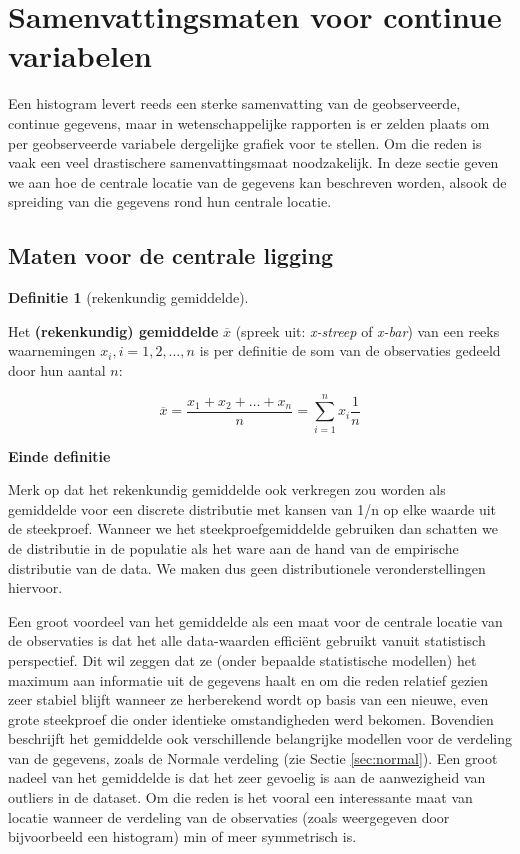 \documentclass[
  12pt,dutch]{book}
\theoremstyle{definition}
\newtheorem{definition}{Definitie}[chapter]
\theoremstyle{definition}
\theoremstyle{definition}
\theoremstyle{definition}
\theoremstyle{remark}
\begin{document}
\section{Samenvattingsmaten voor continue variabelen}\label{sec:summarize}

Een histogram levert reeds een sterke samenvatting van de geobserveerde,
continue gegevens, maar in wetenschappelijke rapporten is er zelden
plaats om per geobserveerde variabele dergelijke grafiek voor te stellen. Om
die reden is vaak een veel drastischere samenvattingsmaat noodzakelijk. In deze
sectie geven we aan hoe de centrale locatie van de gegevens kan beschreven
worden, alsook de spreiding van die gegevens rond hun centrale locatie.

\subsection{Maten voor de centrale ligging}\label{maten-voor-de-centrale-ligging}

\begin{definition}[rekenkundig gemiddelde]
\protect\hypertarget{def:unnamed-chunk-93}{}\label{def:unnamed-chunk-93}~
\end{definition}

Het \textbf{(rekenkundig) gemiddelde} \(\overline{x}\) (spreek uit: \emph{x-streep}
of \emph{x-bar}) van een reeks waarnemingen \(x_i, i=1, 2, \dots, n\) is per
definitie de som van de observaties gedeeld door hun aantal \(n\):

\[\overline{x}= \frac{x_1 + x_2 + \dots + x_n}{n} =\sum_{i=1}^n x_i \frac{1}{n} \]

\textbf{Einde definitie}

Merk op dat het rekenkundig gemiddelde ook verkregen zou worden als gemiddelde voor een discrete distributie met kansen van 1/n op elke waarde uit de steekproef.
Wanneer we het steekproefgemiddelde gebruiken dan schatten we de distributie in de populatie als het ware aan de hand van de empirische distributie van de data. We maken dus geen distributionele veronderstellingen hiervoor.

Een groot voordeel van het gemiddelde als een maat voor de centrale locatie
van de observaties is dat het alle data-waarden efficiënt gebruikt vanuit
statistisch perspectief. Dit wil zeggen dat ze (onder bepaalde statistische modellen)
het maximum aan informatie
uit de gegevens haalt en om die reden relatief gezien zeer stabiel blijft
wanneer ze herberekend wordt op basis van een nieuwe, even grote steekproef
die onder identieke omstandigheden werd bekomen. Bovendien beschrijft het
gemiddelde ook verschillende belangrijke modellen voor de verdeling van de
gegevens, zoals de Normale verdeling (zie Sectie \ref{sec:normal}). Een
groot nadeel van het gemiddelde is dat het zeer gevoelig is aan de
aanwezigheid van outliers in de dataset. Om die reden is het vooral een
interessante maat van locatie wanneer de verdeling van de observaties (zoals
weergegeven door bijvoorbeeld een histogram) min of meer symmetrisch is.
\end{document}

